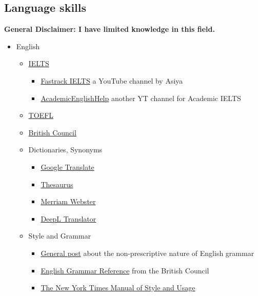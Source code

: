 \documentclass{article}
\begin{document}
\subsection{Language skills}
\textbf{General Disclaimer: I have limited knowledge in this field.}

\begin{itemize}
    \item English
    \begin{itemize}
        \item \href{https://www.ielts.org/}{IELTS}
        \begin{itemize}
            \item \href{https://www.youtube.com/channel/UCRA4UOCBRgv2w9b59pDMyvQ}{Fastrack IELTS} a YouTube channel by Asiya
            \item \href{https://www.youtube.com/channel/UCQ3A7Dnyz1_Fxaa5BCzAPMA}{AcademicEnglishHelp} another YT channel for Academic IELTS
        \end{itemize}
        \item \href{https://www.ets.org/toefl}{TOEFL}
        \item \href{https://learnenglish.britishcouncil.org/}{British Council}
        \item Dictionaries, Synonyms
        \begin{itemize}
            \item \href{https://translate.google.com/}{Google Translate}
            \item \href{https://www.thesaurus.com/}{Thesaurus}
            \item \href{https://www.merriam-webster.com/}{Merriam Webster}
            \item \href{https://www.deepl.com/translator}{DeepL Translator}
        \end{itemize}
        \item Style and Grammar
        \begin{itemize}
            \item \href{https://www.britishcouncil.org/voices-magazine/what-are-correct-rules-english-grammar}{General post} about the non-prescriptive nature of English grammar
            \item \href{https://learnenglish.britishcouncil.org/grammar/english-grammar-reference}{English Grammar Reference} from the British Council
            \item \href{https://www.goodreads.com/book/show/75441.The_New_York_Times_Manual_of_Style_and_Usage}{The New York Times Manual of Style and Usage}

\end{itemize}
\end{itemize}
\end{itemize}
\end{document}
